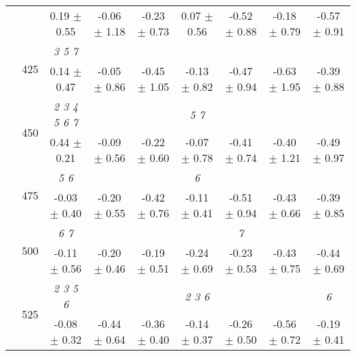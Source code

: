 \begin{table}[h]
{\begin{tabular}{
        ccccccccc}
 & & 0.19 $\pm$ 0.55& -0.06 $\pm$ 1.18& -0.23 $\pm$ 0.73& 0.07 $\pm$ 0.56& -0.52 $\pm$ 0.88& -0.18 $\pm$ 0.79& -0.57 $\pm$ 0.91 \\ 
 & \multirow{2}{*}{425}& \cellcolor[HTML]{EFEFEF} \textit{ 3 5 7 }& \cellcolor[HTML]{EFEFEF} & \cellcolor[HTML]{EFEFEF} & \cellcolor[HTML]{EFEFEF} & \cellcolor[HTML]{EFEFEF} & \cellcolor[HTML]{EFEFEF} & \cellcolor[HTML]{EFEFEF}  \\ 
 & & \cellcolor[HTML]{EFEFEF} 0.14 $\pm$ 0.47& \cellcolor[HTML]{EFEFEF} -0.05 $\pm$ 0.86& \cellcolor[HTML]{EFEFEF} -0.45 $\pm$ 1.05& \cellcolor[HTML]{EFEFEF} -0.13 $\pm$ 0.82& \cellcolor[HTML]{EFEFEF} -0.47 $\pm$ 0.94& \cellcolor[HTML]{EFEFEF} -0.63 $\pm$ 1.95& \cellcolor[HTML]{EFEFEF} -0.39 $\pm$ 0.88 \\ 
 & \multirow{2}{*}{450}& \textit{ 2 3 4 5 6 7 }& & & \textit{ 5 7 }& & &  \\ 
 & & 0.44 $\pm$ 0.21& -0.09 $\pm$ 0.56& -0.22 $\pm$ 0.60& -0.07 $\pm$ 0.78& -0.41 $\pm$ 0.74& -0.40 $\pm$ 1.21& -0.49 $\pm$ 0.97 \\ 
 & \multirow{2}{*}{475}& \cellcolor[HTML]{EFEFEF} \textit{ 5 6 }& \cellcolor[HTML]{EFEFEF} & \cellcolor[HTML]{EFEFEF} & \cellcolor[HTML]{EFEFEF} \textit{ 6 }& \cellcolor[HTML]{EFEFEF} & \cellcolor[HTML]{EFEFEF} & \cellcolor[HTML]{EFEFEF}  \\ 
 & & \cellcolor[HTML]{EFEFEF} -0.03 $\pm$ 0.40& \cellcolor[HTML]{EFEFEF} -0.20 $\pm$ 0.55& \cellcolor[HTML]{EFEFEF} -0.42 $\pm$ 0.76& \cellcolor[HTML]{EFEFEF} -0.11 $\pm$ 0.41& \cellcolor[HTML]{EFEFEF} -0.51 $\pm$ 0.94& \cellcolor[HTML]{EFEFEF} -0.43 $\pm$ 0.66& \cellcolor[HTML]{EFEFEF} -0.39 $\pm$ 0.85 \\ 
 & \multirow{2}{*}{500}& \textit{ 6 7 }& & & & \textit{ 7 }& &  \\ 
 & & -0.11 $\pm$ 0.56& -0.20 $\pm$ 0.46& -0.19 $\pm$ 0.51& -0.24 $\pm$ 0.69& -0.23 $\pm$ 0.53& -0.43 $\pm$ 0.75& -0.44 $\pm$ 0.69 \\ 
 & \multirow{2}{*}{525}& \cellcolor[HTML]{EFEFEF} \textit{ 2 3 5 6 }& \cellcolor[HTML]{EFEFEF} & \cellcolor[HTML]{EFEFEF} & \cellcolor[HTML]{EFEFEF} \textit{ 2 3 6 }& \cellcolor[HTML]{EFEFEF} & \cellcolor[HTML]{EFEFEF} & \cellcolor[HTML]{EFEFEF} \textit{ 6 } \\ 
 & & \cellcolor[HTML]{EFEFEF} -0.08 $\pm$ 0.32& \cellcolor[HTML]{EFEFEF} -0.44 $\pm$ 0.64& \cellcolor[HTML]{EFEFEF} -0.36 $\pm$ 0.40& \cellcolor[HTML]{EFEFEF} -0.14 $\pm$ 0.37& \cellcolor[HTML]{EFEFEF} -0.26 $\pm$ 0.50& \cellcolor[HTML]{EFEFEF} -0.56 $\pm$ 0.72& \cellcolor[HTML]{EFEFEF} -0.19 $\pm$ 0.41 \\ 

\end{tabular}}
\end{table}
